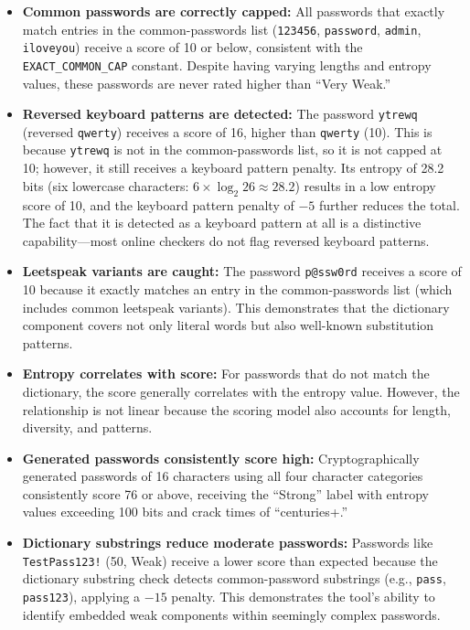 \begin{itemize}
    \item \textbf{Common passwords are correctly capped:} All passwords that exactly match entries in the common-passwords list (\texttt{123456}, \texttt{password}, \texttt{admin}, \texttt{iloveyou}) receive a score of 10 or below, consistent with the \texttt{EXACT\_COMMON\_CAP} constant. Despite having varying lengths and entropy values, these passwords are never rated higher than ``Very Weak.''

    \item \textbf{Reversed keyboard patterns are detected:} The password \texttt{ytrewq} (reversed \texttt{qwerty}) receives a score of 16, higher than \texttt{qwerty} (10). This is because \texttt{ytrewq} is not in the common-passwords list, so it is not capped at 10; however, it still receives a keyboard pattern penalty. Its entropy of 28.2 bits (six lowercase characters: $6 \times \log_2 26 \approx 28.2$) results in a low entropy score of 10, and the keyboard pattern penalty of $-5$ further reduces the total. The fact that it is detected as a keyboard pattern at all is a distinctive capability---most online checkers do not flag reversed keyboard patterns.

    \item \textbf{Leetspeak variants are caught:} The password \texttt{p@ssw0rd} receives a score of 10 because it exactly matches an entry in the common-passwords list (which includes common leetspeak variants). This demonstrates that the dictionary component covers not only literal words but also well-known substitution patterns.

    \item \textbf{Entropy correlates with score:} For passwords that do not match the dictionary, the score generally correlates with the entropy value. However, the relationship is not linear because the scoring model also accounts for length, diversity, and patterns.

    \item \textbf{Generated passwords consistently score high:} Cryptographically generated passwords of 16 characters using all four character categories consistently score 76 or above, receiving the ``Strong'' label with entropy values exceeding 100 bits and crack times of ``centuries+.''

    \item \textbf{Dictionary substrings reduce moderate passwords:} Passwords like \texttt{TestPass123!} (50, Weak) receive a lower score than expected because the dictionary substring check detects common-password substrings (e.g., \texttt{pass}, \texttt{pass123}), applying a $-15$ penalty. This demonstrates the tool's ability to identify embedded weak components within seemingly complex passwords.
\end{itemize}



